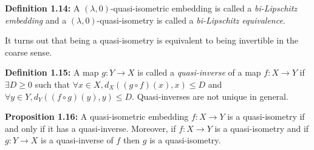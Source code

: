 \documentclass[12pt]{article}
\newcommand{\vs}{\vskip10pt}
\begin{document}
	\textbf{Definition 1.14: } A $(\lambda, 0)$-quasi-isometric embedding is called a \textit{bi-Lipschitz embedding} and a $(\lambda, 0)$-quasi-isometry is called a \textit{bi-Lipschitz equivalence}.
	
	\vs 
	
	It turns out that being a quasi-isometry is equivalent to being invertible in the coarse sense. 
	
	\vs 
	
	\textbf{Definition 1.15: } A map $g: Y \rightarrow X$ is called a \textit{quasi-inverse} of a map $f: X \rightarrow Y$ if $\exists D \geq 0$ such that $\forall x \in X, d_X((g \circ f)(x), x) \leq D$ and $\forall y \in Y, d_Y((f \circ g) (y), y) \leq D$. Quasi-inverses are not unique in general.
	
	\vs 
	
	\textbf{Proposition 1.16: } A quasi-isometric embedding $f: X \rightarrow Y$ is a quasi-isometry if and only if it has a quasi-inverse. Moreover, if $f: X \rightarrow Y$ is a quasi-isometry and if $g: Y \rightarrow X$ is a quasi-inverse of $f$ then $g$ is a quasi-isometry.
	
\end{document}
